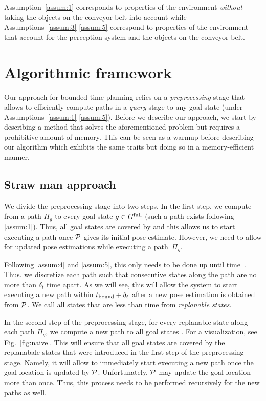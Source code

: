 \documentclass[conference]{IEEEtran}
\begin{document}
Assumption~\ref{assum:1} corresponds to properties of the environment \emph{without} taking the objects on the conveyor belt into account 
while
Assumptions~\ref{assum:3}-\ref{assum:5} correspond to properties of the environment that account for the perception system and the objects on the conveyor belt.


\section{Algorithmic framework}
\label{subsec:strawman}
Our approach for bounded-time planning relies on a \emph{preprocessing} stage that allows to efficiently compute paths in a \emph{query} stage to any goal state (under Assumptions~\ref{assum:1}-\ref{assum:5}). 
%
Before we describe our approach, we start by describing a \naive method that solves the aforementioned problem but requires a prohibitive amount of memory.
%
This can be seen as a warmup before describing our algorithm which exhibits the same traits but doing so in a memory-efficient manner.

\subsection{Straw man approach}
We divide the preprocessing stage into two steps.
In the first step, we compute from \Shome a path $\Pi_g$ to every goal state $ g \in G^{\textrm{full}}$ (such a path exists following \ref{assum:1}).
Thus, all goal states are covered by \Shome and this allows us to start executing a path once $\mathcal{P}$ gives its initial pose estimate.
However, we need to allow for updated pose estimations while executing a path~$\Pi_g$. 

%
Following \ref{assum:4} and \ref{assum:5}, this only needs to be done up until time~\Trc.
Thus. we discretize each path such that consecutive states along the path are no more than $\delta _t$ time apart. As we will see, this will allow the system to start executing a new path within $t_{\textrm{bound}} + \delta_t$ after a new pose estimation is obtained from $\mathcal{P}$.
%
We call all states that are less than \Trc time from \Shome \emph{replanable states}.


In the second step of the preprocessing stage, for every replanable state along each path $\Pi_g$, we compute a new path to all goal states .
For a visualization, see Fig.~\ref{fig:naive}.
%
This will ensure that all goal states are covered by the replanabale states that were introduced in the first step of the preprocessing stage. Namely, it will allow to immediately start executing a new path once the goal location is updated by $\mathcal{P}$.
%
Unfortunately, $\mathcal{P}$ may update the goal location more than once. Thus, this process needs to be performed recursively for the new paths as well.
\end{document}
